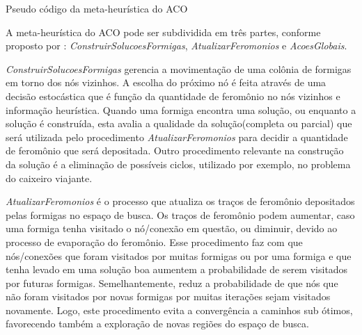 \begin{algorithm}[H]


  \caption{Pseudo código da meta-heurística do ACO\label{lst:meta-heuristica_aco}}
\end{algorithm}

A meta-heurística do ACO pode ser subdividida em três partes,
conforme proposto por \cite{doringo2004ant}: \textit{ConstruirSolucoesFormigas},
\textit{AtualizarFeromonios} e \textit{AcoesGlobais}.

\textit{ConstruirSolucoesFormigas} gerencia a movimentação de uma colônia de formigas
em torno dos nós vizinhos. A escolha do próximo nó é feita através de uma decisão
estocástica que é função da quantidade de feromônio no nós vizinhos e informação heurística.
Quando uma formiga encontra uma solução, ou enquanto a solução é construída, esta avalia a
qualidade da solução(completa ou parcial) que será utilizada pelo procedimento
\textit{AtualizarFeromonios} para decidir a quantidade de feromônio que será depositada.
Outro procedimento relevante na construção da solução é a eliminação de possíveis ciclos, utilizado
por exemplo, no problema do caixeiro viajante.

\textit{AtualizarFeromonios} é o processo que atualiza os traços de feromônio depositados pelas
formigas no espaço de busca. Os traços de feromônio podem aumentar, caso uma formiga tenha visitado
o nó/conexão em questão, ou diminuir, devido ao processo de evaporação do feromônio. Esse procedimento faz com 
que nós/conexões que foram visitados por muitas formigas ou por uma formiga e que tenha levado em
uma solução boa aumentem a probabilidade de serem visitados por futuras formigas. Semelhantemente, reduz 
a probabilidade de que nós que não foram visitados por novas formigas por muitas iterações sejam visitados
novamente. Logo, este procedimento evita a convergência a caminhos sub ótimos, favorecendo também a exploração
de novas regiões do espaço de busca.

